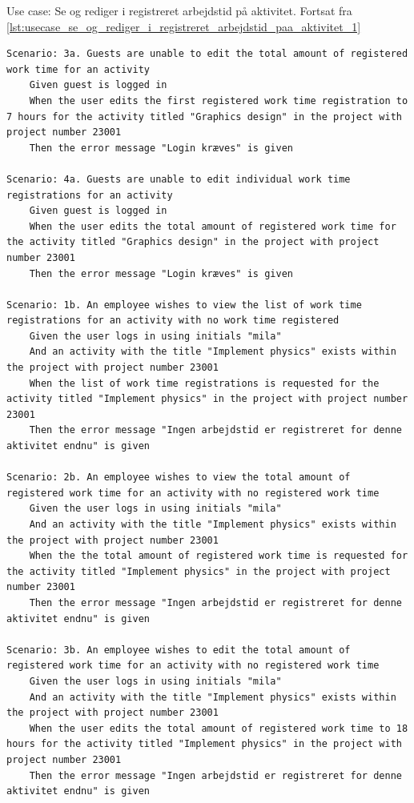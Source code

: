 \begin{listing}[H]
    \caption{Use case: Se og rediger i registreret arbejdstid på aktivitet. Fortsat fra \cref{lst:usecase_se_og_rediger_i_registreret_arbejdstid_paa_aktivitet_1}}\label{lst:usecase_se_og_rediger_i_registreret_arbejdstid_paa_aktivitet_2}
    \begin{verbatim}
Scenario: 3a. Guests are unable to edit the total amount of registered work time for an activity
    Given guest is logged in
    When the user edits the first registered work time registration to 7 hours for the activity titled "Graphics design" in the project with project number 23001
    Then the error message "Login kræves" is given

Scenario: 4a. Guests are unable to edit individual work time registrations for an activity
    Given guest is logged in
    When the user edits the total amount of registered work time for the activity titled "Graphics design" in the project with project number 23001
    Then the error message "Login kræves" is given

Scenario: 1b. An employee wishes to view the list of work time registrations for an activity with no work time registered
    Given the user logs in using initials "mila"
    And an activity with the title "Implement physics" exists within the project with project number 23001
    When the list of work time registrations is requested for the activity titled "Implement physics" in the project with project number 23001
    Then the error message "Ingen arbejdstid er registreret for denne aktivitet endnu" is given

Scenario: 2b. An employee wishes to view the total amount of registered work time for an activity with no registered work time
    Given the user logs in using initials "mila"
    And an activity with the title "Implement physics" exists within the project with project number 23001
    When the the total amount of registered work time is requested for the activity titled "Implement physics" in the project with project number 23001
    Then the error message "Ingen arbejdstid er registreret for denne aktivitet endnu" is given

Scenario: 3b. An employee wishes to edit the total amount of registered work time for an activity with no registered work time
    Given the user logs in using initials "mila"
    And an activity with the title "Implement physics" exists within the project with project number 23001
    When the user edits the total amount of registered work time to 18 hours for the activity titled "Implement physics" in the project with project number 23001
    Then the error message "Ingen arbejdstid er registreret for denne aktivitet endnu" is given


\end{verbatim}
\end{listing}
